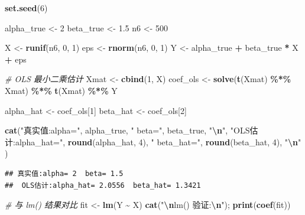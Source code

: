 \documentclass[
]{article}
\newenvironment{Shaded}{\begin{snugshade}}{\end{snugshade}}
\newcommand{\CommentTok}[1]{\textcolor[rgb]{0.56,0.35,0.01}{\textit{#1}}}
\newcommand{\DecValTok}[1]{\textcolor[rgb]{0.00,0.00,0.81}{#1}}
\newcommand{\FloatTok}[1]{\textcolor[rgb]{0.00,0.00,0.81}{#1}}
\newcommand{\FunctionTok}[1]{\textcolor[rgb]{0.13,0.29,0.53}{\textbf{#1}}}
\newcommand{\NormalTok}[1]{#1}
\newcommand{\OtherTok}[1]{\textcolor[rgb]{0.56,0.35,0.01}{#1}}
\newcommand{\SpecialCharTok}[1]{\textcolor[rgb]{0.81,0.36,0.00}{\textbf{#1}}}
\newcommand{\StringTok}[1]{\textcolor[rgb]{0.31,0.60,0.02}{#1}}
\begin{document}
\begin{Shaded}
\begin{Highlighting}[]
\FunctionTok{set.seed}\NormalTok{(}\DecValTok{6}\NormalTok{)}

\NormalTok{alpha\_true }\OtherTok{\textless{}{-}} \DecValTok{2}
\NormalTok{beta\_true  }\OtherTok{\textless{}{-}} \FloatTok{1.5}
\NormalTok{n6         }\OtherTok{\textless{}{-}} \DecValTok{500}

\NormalTok{X   }\OtherTok{\textless{}{-}} \FunctionTok{runif}\NormalTok{(n6, }\DecValTok{0}\NormalTok{, }\DecValTok{1}\NormalTok{)}
\NormalTok{eps }\OtherTok{\textless{}{-}} \FunctionTok{rnorm}\NormalTok{(n6, }\DecValTok{0}\NormalTok{, }\DecValTok{1}\NormalTok{)}
\NormalTok{Y   }\OtherTok{\textless{}{-}}\NormalTok{ alpha\_true }\SpecialCharTok{+}\NormalTok{ beta\_true }\SpecialCharTok{*}\NormalTok{ X }\SpecialCharTok{+}\NormalTok{ eps}

\CommentTok{\# OLS 最小二乘估计}
\NormalTok{Xmat }\OtherTok{\textless{}{-}} \FunctionTok{cbind}\NormalTok{(}\DecValTok{1}\NormalTok{, X)}
\NormalTok{coef\_ols }\OtherTok{\textless{}{-}} \FunctionTok{solve}\NormalTok{(}\FunctionTok{t}\NormalTok{(Xmat) }\SpecialCharTok{\%*\%}\NormalTok{ Xmat) }\SpecialCharTok{\%*\%} \FunctionTok{t}\NormalTok{(Xmat) }\SpecialCharTok{\%*\%}\NormalTok{ Y}

\NormalTok{alpha\_hat }\OtherTok{\textless{}{-}}\NormalTok{ coef\_ols[}\DecValTok{1}\NormalTok{]}
\NormalTok{beta\_hat  }\OtherTok{\textless{}{-}}\NormalTok{ coef\_ols[}\DecValTok{2}\NormalTok{]}

\FunctionTok{cat}\NormalTok{(}\StringTok{"真实值:alpha="}\NormalTok{, alpha\_true, }\StringTok{" beta="}\NormalTok{, beta\_true, }\StringTok{"}\SpecialCharTok{\textbackslash{}n}\StringTok{"}\NormalTok{,}
\StringTok{"OLS估计:alpha\_hat="}\NormalTok{, }\FunctionTok{round}\NormalTok{(alpha\_hat, }\DecValTok{4}\NormalTok{),}
\StringTok{" beta\_hat="}\NormalTok{, }\FunctionTok{round}\NormalTok{(beta\_hat, }\DecValTok{4}\NormalTok{), }\StringTok{"}\SpecialCharTok{\textbackslash{}n}\StringTok{"}
\NormalTok{)}
\end{Highlighting}
\end{Shaded}

\begin{verbatim}
## 真实值:alpha= 2  beta= 1.5 
##  OLS估计:alpha_hat= 2.0556  beta_hat= 1.3421
\end{verbatim}

\begin{Shaded}
\begin{Highlighting}[]
\CommentTok{\# 与 lm() 结果对比}
\NormalTok{fit }\OtherTok{\textless{}{-}} \FunctionTok{lm}\NormalTok{(Y }\SpecialCharTok{\textasciitilde{}}\NormalTok{ X)}
\FunctionTok{cat}\NormalTok{(}\StringTok{"}\SpecialCharTok{\textbackslash{}n}\StringTok{lm() 验证:}\SpecialCharTok{\textbackslash{}n}\StringTok{"}\NormalTok{); }\FunctionTok{print}\NormalTok{(}\FunctionTok{coef}\NormalTok{(fit))}
\end{Highlighting}
\end{Shaded}
\end{document}
